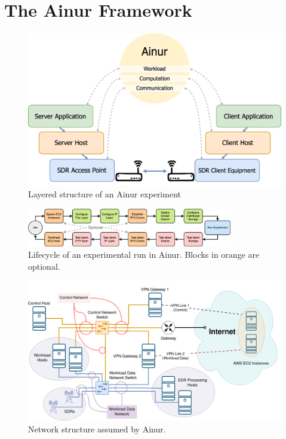 \section{The Ainur Framework}\label{sec:ainur}

\begin{figure}[t]
    \centering
    \includegraphics[width=0.9\linewidth]{publications/2022Ainur/figures/overview.jpg}
    \caption{Layered structure of an Ainur experiment}\label{fig:overview}
\end{figure}

\begin{figure}
    \centering
    \includegraphics[width=0.8\textwidth]{publications/2022Ainur/figures/flow2.png}
    \caption{Lifecycle of an experimental run in Ainur. Blocks in orange are optional.}\label{fig:flow}
\end{figure}

\begin{figure}
    \centering
    \includegraphics[width=.8\textwidth]{publications/2022Ainur/figures/network.png}
    \caption{Network structure assumed by Ainur.}\label{fig:network}
\end{figure}


